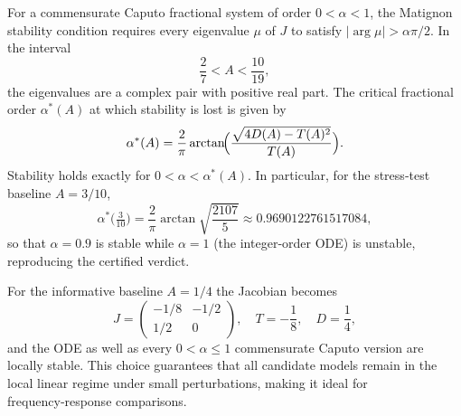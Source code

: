 For a commensurate Caputo fractional system of order \(0<\alpha<1\), the Matignon stability condition requires every eigenvalue \(\mu\) of \(J\) to satisfy \(|\arg\mu|>\alpha\pi/2\). In the interval
\[
\frac27<A<\frac{10}{19},
\]
the eigenvalues are a complex pair with positive real part. The critical fractional order \(\alpha^*(A)\) at which stability is lost is given by
\begin{equation}
\label{eq:alpha}
\alpha^*(A)=\frac{2}{\pi}\arctan\!\Bigl(
\frac{\sqrt{4D(A)-T(A)^2}}{T(A)}\Bigr).
\end{equation}
Stability holds exactly for \(0<\alpha<\alpha^*(A)\).  In particular, for the stress‑test baseline \(A=3/10\),
\[
\alpha^*\!\bigl(\tfrac3{10}\bigr)=\frac{2}{\pi}\arctan\sqrt{\frac{2107}{5}}
\approx0.9690122761517084,
\]
so that \(\alpha=0.9\) is stable while \(\alpha=1\) (the integer‑order ODE) is unstable, reproducing the certified verdict.

For the informative baseline \(A=1/4\) the Jacobian becomes
\[
J=\begin{pmatrix}-1/8&-1/2\\1/2&0\end{pmatrix},
\quad T=-\frac18,\quad D=\frac14,
\]
and the ODE as well as every \(0<\alpha\le1\) commensurate Caputo version are locally stable.  This choice guarantees that all candidate models remain in the local linear regime under small perturbations, making it ideal for frequency‑response comparisons.

